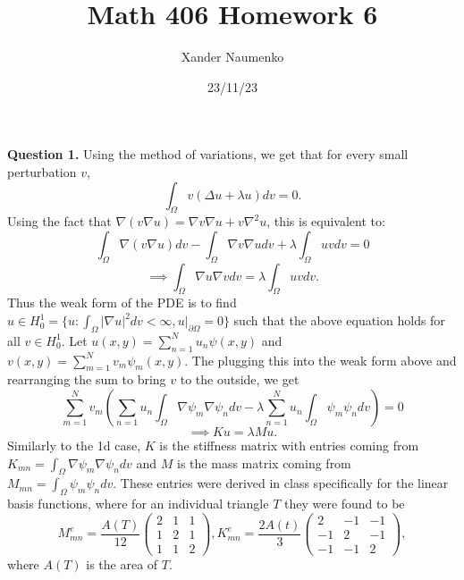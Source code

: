\documentclass[letterpaper, reqno,11pt]{article}
\begin{document}
\title{Math 406 Homework 6}
\date{23/11/23}
\author{Xander Naumenko}
\maketitle

{\medskip\noindent\bf Question 1.} Using the method of variations, we get that for every small perturbation $v$,
\[
\int_{\Omega}v\left( \Delta u+\lambda u \right) dv=0
.\]
Using the fact that $\nabla (v\nabla  u)=\nabla v \nabla u+v\nabla ^2u$, this is equivalent to:
\[
\int_{\Omega}\nabla (v\nabla u)dv-\int_{\Omega}\nabla v \nabla u dv+\lambda \int_{\Omega}uvdv=0
\]
\[
\implies \int_{\Omega}\nabla u\nabla v dv=\lambda \int_{\Omega}uv dv
.\]
Thus the weak form of the PDE is to find $u\in H_{0}^{1}=\{u: \int_{\Omega}\left| \nabla  u \right| ^2dv<\infty,u\big|_{\partial \Omega}=0\}$ such that the above equation holds for all $v\in H_{0}^{1}$. Let $u(x,y)=\sum_{n=1}^{N}u_n\psi(x,y)$ and $v(x,y)=\sum_{m=1}^{N}v_m\psi_m(x,y)$. The plugging this into the weak form above and rearranging the sum to bring $v$ to the outside, we get
\[
\sum_{m=1}^{N}v_m \left( \sum_{n=1}u_n\int_{\Omega} \nabla \psi_m\nabla \psi_ndv-\lambda\sum_{n=1}^{N}u_n\int_{\Omega}\psi_m\psi_n dv \right)=0
\]
\[
\implies Ku=\lambda Mu
.\]
Similarly to the 1d case, $K$ is the stiffness matrix with entries coming from $K_{mn}=\int_{\Omega}\nabla \psi_m\nabla \psi_n dv$ and $M$ is the mass matrix coming from $M_{mn}=\int_{\Omega}\psi_m\psi_ndv$. These entries were derived in class specifically for the linear basis functions, where for an individual triangle $T$ they were found to be
\[
    M_{mn}^{e}=\frac{A(T)}{12}\begin{pmatrix} 2&1&1\\1&2&1\\1&1&2 \end{pmatrix},K^{e}_{mn}=\frac{2A(t)}{3}\begin{pmatrix} 2&-1&-1\\-1&2&-1\\-1&-1&2 \end{pmatrix} 
,\]
where $A(T)$ is the area of $T$.
\end{document}
